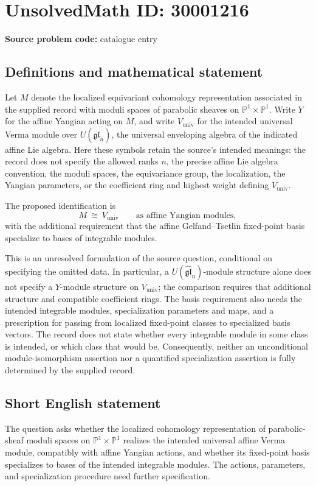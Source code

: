 \documentclass[11pt]{article}
\newcommand{\PP}{\mathbb{P}}
\begin{document}
\section*{UnsolvedMath ID: 30001216}
\textbf{Source problem code:} catalogue entry
\subsection{Definitions and mathematical statement}
Let \(M\) denote the localized equivariant cohomology representation associated in the supplied record with moduli spaces of parabolic sheaves on \(\PP^1\times\PP^1\). Write \(Y\) for the affine Yangian acting on \(M\), and write \(V_{\mathrm{univ}}\) for the intended universal Verma module over \(U(\widehat{\mathfrak{gl}}_n)\), the universal enveloping algebra of the indicated affine Lie algebra. Here these symbols retain the source's intended meanings: the record does not specify the allowed ranks \(n\), the precise affine Lie algebra convention, the moduli spaces, the equivariance group, the localization, the Yangian parameters, or the coefficient ring and highest weight defining \(V_{\mathrm{univ}}\).

The proposed identification is
\[
M\ \cong\ V_{\mathrm{univ}}
\qquad\text{as affine Yangian modules},
\]
with the additional requirement that the affine Gelfand--Tsetlin fixed-point basis specialize to bases of integrable modules.

This is an unresolved formulation of the source question, conditional on specifying the omitted data. In particular, a \(U(\widehat{\mathfrak{gl}}_n)\)-module structure alone does not specify a \(Y\)-module structure on \(V_{\mathrm{univ}}\); the comparison requires that additional structure and compatible coefficient rings. The basis requirement also needs the intended integrable modules, specialization parameters and maps, and a prescription for passing from localized fixed-point classes to specialized basis vectors. The record does not state whether every integrable module in some class is intended, or which class that would be. Consequently, neither an unconditional module-isomorphism assertion nor a quantified specialization assertion is fully determined by the supplied record.
\subsection{Short English statement}
The question asks whether the localized cohomology representation of parabolic-sheaf moduli spaces on \(\PP^1\times\PP^1\) realizes the intended universal affine Verma module, compatibly with affine Yangian actions, and whether its fixed-point basis specializes to bases of the intended integrable modules. The actions, parameters, and specialization procedure need further specification.
\end{document}

